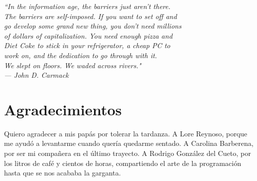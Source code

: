 
\begin{flushright}{\slshape
        ``In the information age, the barriers just aren't there. \\
        The barriers are self-imposed. If you want to set off and\\
        go develop some grand new thing, you don't need millions \\
        of dollars of capitalization. You need enough pizza and  \\
        Diet Coke to stick in your refrigerator, a cheap PC to   \\
        work on, and the dedication to go through with it.       \\
        We slept on floors.  We waded across rivers."            \\
    --- \textit{John D. Carmack}}
\end{flushright}



\bigskip

\begingroup
\let\clearpage\relax
\let\cleardoublepage\relax
\let\cleardoublepage\relax
\chapter*{Agradecimientos}

Quiero agradecer a mis papás por tolerar la tardanza. A Lore Reynoso, porque me
ayudó a levantarme cuando quería quedarme sentado. A Carolina Barberena, por
ser mi compañera en el último trayecto. A Rodrigo González del Cueto, por los
litros de café y cientos de horas, compartiendo el arte de la programación
hasta que se nos acababa la garganta.

\bigskip


\endgroup

